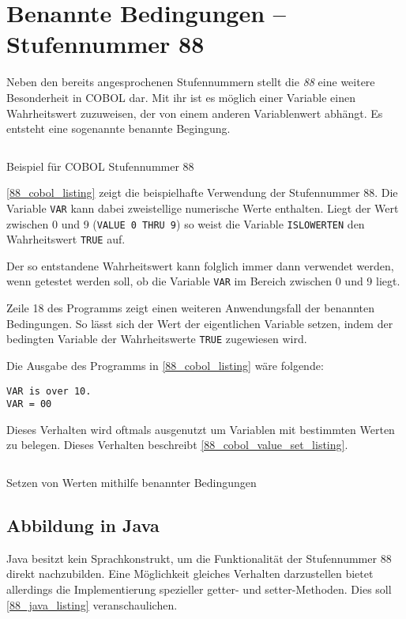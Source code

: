 \section{Benannte Bedingungen -- Stufennummer 88}
Neben den bereits angesprochenen Stufennummern stellt die \textit{88} eine weitere Besonderheit in COBOL dar. Mit ihr ist es möglich einer Variable einen Wahrheitswert zuzuweisen, der von einem anderen Variablenwert abhängt. Es entsteht eine sogenannte benannte Begingung.

\begin{listing}[H]
  \inputminted{cobol}{Code/88_section.cbl.txt}
  \caption{Beispiel für COBOL Stufennummer 88}
  \label{88_cobol_listing}
\end{listing} 

\autoref{88_cobol_listing} zeigt die beispielhafte Verwendung der Stufennummer 88. Die Variable \texttt{VAR} kann dabei zweistellige numerische Werte enthalten. Liegt der Wert zwischen 0 und 9 (\texttt{VALUE 0 THRU 9}) so weist die Variable \texttt{ISLOWERTEN} den Wahrheitswert \texttt{TRUE} auf.

Der so entstandene Wahrheitswert kann folglich immer dann verwendet werden, wenn getestet werden soll, ob die Variable \texttt{VAR} im Bereich zwischen 0 und 9 liegt.

Zeile 18 des Programms zeigt einen weiteren Anwendungsfall der benannten Bedingungen. So lässt sich der Wert der eigentlichen Variable setzen, indem der bedingten Variable der Wahrheitswerte \texttt{TRUE} zugewiesen wird.

Die Ausgabe des Programms in \autoref{88_cobol_listing} wäre folgende:
\begin{verbatim}
VAR is over 10.
VAR = 00
\end{verbatim}

Dieses Verhalten wird oftmals ausgenutzt um Variablen mit bestimmten Werten zu belegen. Dieses Verhalten beschreibt \autoref{88_cobol_value_set_listing}.

\begin{listing}[H]
  \inputminted{cobol}{Code/88_section_value_set.cbl.txt}
  \caption{Setzen von Werten mithilfe benannter Bedingungen}
  \label{88_cobol_value_set_listing}
\end{listing} 

\subsection*{Abbildung in Java}
Java besitzt kein Sprachkonstrukt, um die Funktionalität der Stufennummer 88 direkt nachzubilden. Eine Möglichkeit gleiches Verhalten darzustellen bietet allerdings die Implementierung spezieller getter- und setter-Methoden. Dies soll \autoref{88_java_listing} veranschaulichen.

